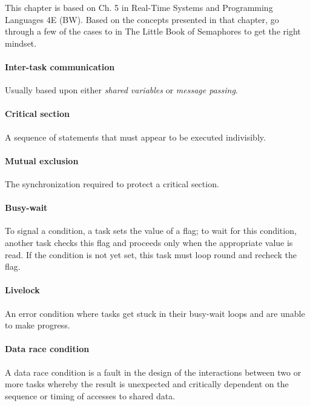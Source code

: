 
This chapter is based on Ch. 5 in Real-Time Systems and Programming Languages 4E (BW). Based on the concepts presented in that chapter, go through a few of the cases to in The Little Book of Semaphores to get the right mindset.

\sepline

\paragraph{Inter-task communication} Usually based upon either \textit{shared variables} or \textit{message passing}.

\paragraph{Critical section} A sequence of statements that must appear to be executed indivisibly.

\paragraph{Mutual exclusion} The synchronization required to protect a critical section.

\paragraph{Busy-wait} To signal a condition, a task sets the value of a flag; to wait for this condition, another task checks this flag and proceeds only when the appropriate value is read. If the condition is not yet set, this task must loop round and recheck the flag.

\paragraph{Livelock} An error condition where tasks get stuck in their busy-wait loops and are unable to make progress.

\paragraph{Data race condition} A data race condition is a fault in the design of the interactions between two or more tasks whereby the result is unexpected and critically dependent on the sequence or timing of accesses to shared data.

